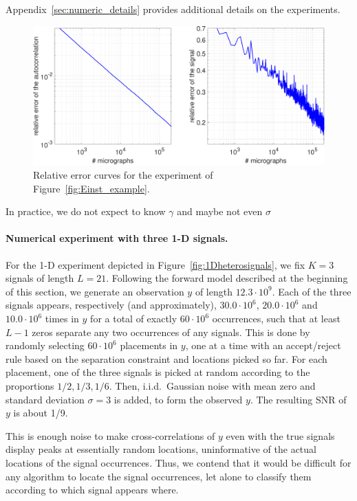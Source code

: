 \documentclass[12pt]{article}
\newcommand{\1}{\mathbf{1}}
\theoremstyle{plain}
\theoremstyle{definition}
\theoremstyle{remark}
\theoremstyle{plain}
\theoremstyle{remark}
\theoremstyle{plain}
\theoremstyle{plain}
\theoremstyle{plain}
\numberwithin{equation}{section}
\begin{document}
 Appendix~\ref{sec:numeric_details} provides additional details on the experiments. 

\begin{figure}[h]
	\centering
	\includegraphics[width=.8\linewidth]{Einstein_recovery_error_combined}
	\caption{\label{fig:error_per_micro}Relative error curves for the experiment of Figure~\ref{fig:Einst_example}.}
\end{figure}


In practice, we do not expect to know $\gamma$ and maybe not even $\sigma$


\paragraph{Numerical experiment with three 1-D signals.}


For the 1-D experiment depicted in Figure~\ref{fig:1Dheterosignals}, we fix $K = 3$ signals of length $L = 21$. Following the forward model described at the beginning of this section, we generate an observation $y$ of length $12.3 \cdot 10^9$. Each of the three signals appears, respectively (and approximately), $30.0 \cdot 10^6$, $20.0 \cdot 10^6$ and $10.0 \cdot 10^6$ times in $y$ for a total of exactly $60 \cdot 10^6$ occurrences, such that at least $L-1$ zeros separate any two occurrences of any signals. 
This is done by randomly selecting $60 \cdot 10^6$ placements in $y$, one at a time with an accept/reject rule based on the separation constraint and locations picked so far. For each placement, one of the three signals is picked at random according to the proportions $1/2, 1/3, 1/6$. Then, i.i.d.\ Gaussian noise with mean zero and standard deviation $\sigma = 3$ is added, to form the observed $y$. The resulting SNR of $y$
is about 1/9.


This is enough noise to make cross-correlations of $y$ even with the true signals display peaks at essentially random locations, uninformative of the actual locations of the signal occurrences. Thus, we contend that it would be difficult for any algorithm to locate the signal occurrences, let alone to classify them according to which signal appears where.
\end{document}
